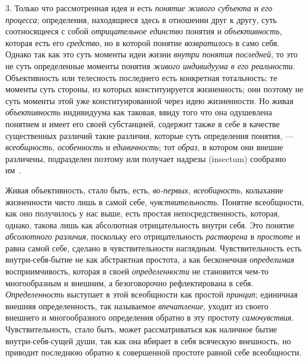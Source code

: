 \documentclass[twoside]{article}
\begin{document}
{{{3. Только что рассмотренная идея и есть
{\em понятие живого субъекта}
и {\em его процесса};
определения, находящиеся здесь в отношении друг к другу, суть
соотносящееся с собой {\em отрицательное
единство} понятия и
{\em объективность},
которая есть его
{\em средство}, но в
которой понятие {\em возвратилось}
в само себя. Однако так как это суть моменты идеи жизни
{\em внутри понятия последней},
то это не суть определенные моменты понятия
{\em живого индивидуума в его
реальности}. Объективность или телесность последнего есть
конкретная тотальность; те моменты суть стороны, из которых конституируется
жизненность; они поэтому не суть моменты этой уже конституированной через
идею жизненности. Но живая
{\em объективность}
индивидуума как таковая, ввиду того что она одушевлена
понятием и имеет его своей субстанцией, содержит также в себе в качестве
существенных различий такие различия, которые суть определения понятия, —
{\em всеобщность, особенность
}и {\em единичность};
тот {\em образ},
в котором они внешне различены, подразделен поэтому или
получает надрезы (insectum) сообразно
им~\label{bkm:bm95}.

Живая объективность, стало быть, есть,
{\em во-первых, всеобщность},
колыхание жизненности чисто лишь в самой себе,
{\em чувствительность}.
Понятие всеобщности, как оно получилось у нас выше, есть
простая непосредственность, которая, однако, такова лишь как абсолютная
отрицательность внутри себя. Это понятие
{\em абсолютного различия},
поскольку его отрицательность
{\em растворена} в
{\em простоте} и равна
самой себе, сделано в чувствительности наглядным. Чувствительность есть
внутри-себя-бытие не как абстрактная простота, а как бесконечная
{\em определимая}
восприимчивость, которая в своей
{\em определенности} не
становится чем-то многообразным и внешним, а безоговорочно рефлектирована в
себя. {\em Определенность}
выступает в этой всеобщности как простой
{\em принцип}; единичная
внешняя определенность, так называемое
{\em впечатление}, уходит
из своего внешнего и многообразного определения обратно в
эту простоту {\em самочувствия}.
Чувствительность, стало быть, может рассматриваться как
наличное бытие внутри-себя-сущей души, так как она вбирает в себя всяческую
внешность, но приводит последнюю обратно к совершенной простоте равной себе
всеобщности.

}}}
\end{document}

